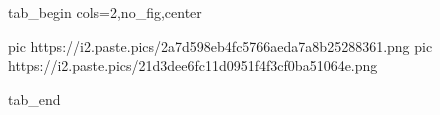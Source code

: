  
 
 
 
 


\ifcmt
  tab_begin cols=2,no_fig,center

     pic https://i2.paste.pics/2a7d598eb4fc5766aeda7a8b25288361.png
		 pic https://i2.paste.pics/21d3dee6fc11d0951f4f3cf0ba51064e.png

  tab_end
\fi
